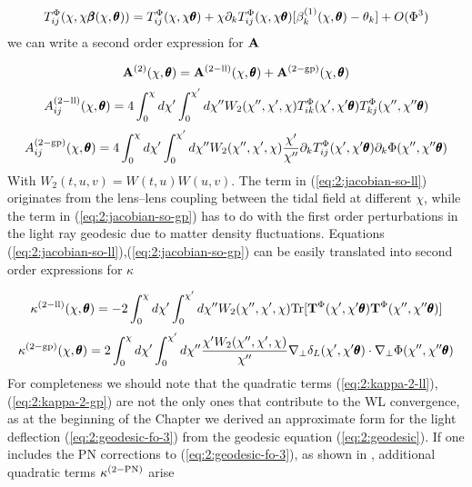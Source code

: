 \begin{equation}
\label{eq:2:tidalapprox}
T^{\Phi}_{ij}(\chi,\chi\pmb{\beta}(\chi,\pmb{\theta})) = T^{\Phi}_{ij}(\chi,\chi\pmb{\theta}) + \chi\partial_kT^{\Phi}_{ij}(\chi,\chi\pmb{\theta})[\beta_k^{(1)}(\chi,\pmb{\theta})-\theta_k] + O(\Phi^3) 
\end{equation}
%
we can write a second order expression for $\mathbf{A}$ 

\begin{equation}
\label{eq:2:jacobian-so}
\mathbf{A}^{(2)}(\chi,\pmb{\theta}) = \mathbf{A}^{(2-{\rm ll})}(\chi,\pmb{\theta}) + \mathbf{A}^{(2-{\rm gp})}(\chi,\pmb{\theta}) 
\end{equation}
%
\begin{equation}
\label{eq:2:jacobian-so-ll}
A_{ij}^{(2-{\rm ll})}(\chi,\pmb{\theta}) = 4\int_0^\chi d\chi'\int_0^{\chi'}d\chi'' W_2(\chi'',\chi',\chi)T^{\Phi}_{ik}(\chi',\chi'\pmb{\theta})T^{\Phi}_{kj}(\chi'',\chi''\pmb{\theta})
\end{equation} 
%
\begin{equation}
\label{eq:2:jacobian-so-gp}
A_{ij}^{(2-{\rm gp})}(\chi,\pmb{\theta}) = 4\int_0^\chi d\chi'\int_0^{\chi'}d\chi'' W_2(\chi'',\chi',\chi)\frac{\chi'}{\chi''}\partial_kT^{\Phi}_{ij}(\chi',\chi'\pmb{\theta})\partial_k\Phi(\chi'',\chi''\pmb{\theta})
\end{equation} 
%
With $W_2(t,u,v)=W(t,u)W(u,v)$. The term in (\ref{eq:2:jacobian-so-ll}) originates from the lens--lens coupling between the tidal field at different $\chi$, while the term in (\ref{eq:2:jacobian-so-gp}) has to do with the first order perturbations in the light ray geodesic due to matter density fluctuations. Equations (\ref{eq:2:jacobian-so-ll}),(\ref{eq:2:jacobian-so-gp}) can be easily translated into second order expressions for $\kappa$

\begin{equation}
\label{eq:2:kappa-2-ll}
\kappa^{(2-{\rm ll})}(\chi,\pmb{\theta}) = -2\int_0^\chi d\chi'\int_0^{\chi'}d\chi'' W_2(\chi'',\chi',\chi){\rm Tr} [\mathbf{T}^{\Phi}(\chi',\chi'\pmb{\theta})\mathbf{T}^{\Phi}(\chi'',\chi''\pmb{\theta})]
\end{equation} 
%
\begin{equation}
\label{eq:2:kappa-2-gp}
\kappa^{(2-{\rm gp})}(\chi,\pmb{\theta}) = 2\int_0^\chi d\chi'\int_0^{\chi'}d\chi'' \frac{\chi'W_2(\chi'',\chi',\chi)}{\chi''}\nabla_\perp \delta_L(\chi',\chi'\pmb{\theta})\cdot\nabla_\perp\Phi(\chi'',\chi''\pmb{\theta})
\end{equation} 
%
For completeness we should note that the quadratic terms (\ref{eq:2:kappa-2-ll}),(\ref{eq:2:kappa-2-gp}) are not the only ones that contribute to the WL convergence, as at the beginning of the Chapter we derived an approximate form for the light deflection (\ref{eq:2:geodesic-fo-3}) from the geodesic equation (\ref{eq:2:geodesic}). If one includes the PN corrections to (\ref{eq:2:geodesic-fo-3}), as shown in \citep{PNLensing}, additional quadratic terms $\kappa^{(2-{\rm PN})}$ arise

